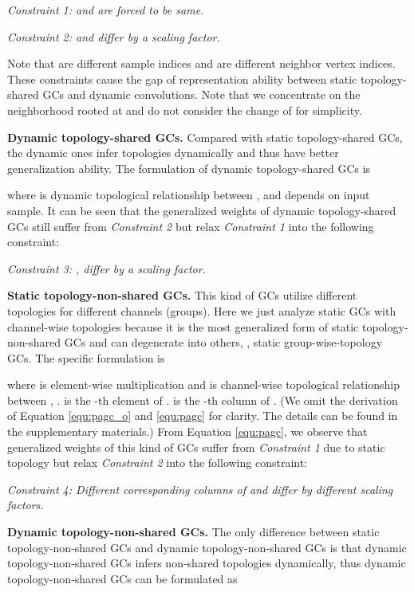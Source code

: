 \documentclass[10pt,twocolumn,letterpaper]{article}
\begin{document}
\noindent \textit{Constraint 1:  and  are forced to be same.}

\noindent \textit{Constraint 2:  and  differ by a scaling factor.}

Note that  are different sample indices and  are different neighbor vertex indices. These constraints cause the gap of representation ability between static topology-shared GCs and dynamic convolutions. Note that we concentrate on the neighborhood rooted at  and do not consider the change of  for simplicity.



\noindent \textbf{Dynamic topology-shared GCs.} Compared with static topology-shared GCs, the dynamic ones infer topologies dynamically and thus have better generalization ability. The formulation of dynamic topology-shared GCs is
\vspace{-0.15cm}

where  is dynamic topological relationship between ,  and depends on input sample. It can be seen that the generalized weights of dynamic topology-shared GCs still suffer from \textit{Constraint 2} but relax \textit{Constraint 1} into the following constraint:

\noindent \textit{Constraint 3: ,  differ by a scaling factor.}

\noindent \textbf{Static topology-non-shared GCs.} This kind of GCs utilize different topologies for different channels (groups). Here we just analyze static GCs with channel-wise topologies because it is the most generalized form of static topology-non-shared GCs and can degenerate into others, \eg, static group-wise-topology GCs. The specific formulation is
\vspace{-0.15cm}

where  is element-wise multiplication and  is channel-wise topological relationship between , .  is the -th element of .  is the -th column of . (We omit the derivation of Equation \ref{equ:pagc_o} and \ref{equ:pagc} for clarity. The details can be found in the supplementary materials.) From Equation \ref{equ:pagc}, we observe that generalized weights of this kind of GCs suffer from \textit{Constraint 1} due to static topology but relax \textit{Constraint 2} into the following constraint:

\noindent \textit{Constraint 4: Different corresponding columns of  and  differ by different scaling factors.}

\noindent \textbf{Dynamic topology-non-shared GCs.} The only difference between static topology-non-shared GCs and dynamic topology-non-shared GCs is that dynamic topology-non-shared GCs infers non-shared topologies dynamically, thus dynamic topology-non-shared GCs can be formulated as
\vspace{-0.15cm}
\end{document}
